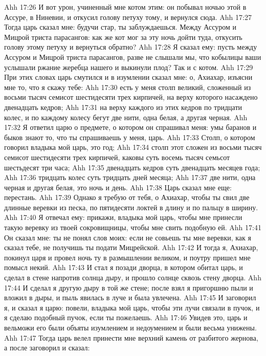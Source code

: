 \vs Ahh 17:26
И вот урон, учиненный мне котом этим: он побывал ночью этой в Ассуре, в Ниневии, и откусил голову петуху тому, и вернулся сюда.
\vs Ahh 17:27
Тогда царь сказал мне: будучи стар, ты заблуждаешься. Между Ассуром и Мицрой триста парасангов: как же кот мог за эту ночь дойти туда, откусить голову этому петуху и вернуться обратно?
\vs Ahh 17:28
Я сказал ему: пусть между Ассуром и Мицрой триста парасангов, разве не слышали мы, что кобылицы ваши услышали ржание жеребца нашего и выкинули плод? Так и с котом.
\vs Ahh 17:29
При этих словах царь смутился и в изумлении сказал мне: о, Ахиахар, изъясни мне то, что я скажу тебе:
\vs Ahh 17:30
есть у меня столп великий, сложенный из восьми тысяч семисот шестидесяти трех кирпичей, на верху которого насаждено двенадцать кедров;
\vs Ahh 17:31
на верху каждого из этих кедров по тридцати колес, и по каждому колесу бегут две нити, одна белая, а другая черная.
\vs Ahh 17:32
Я ответил царю о предмете, о котором он спрашивал меня: умы баранов и быков знают то, что ты спрашиваешь у меня, царь.
\vs Ahh 17:33
Столп, о котором говорил владыка мой царь, это год;
\vs Ahh 17:34
столп этот сложен из восьми тысяч семисот шестидесяти трех кирпичей, каковы суть восемь тысяч семьсот шестьдесят три часа;
\vs Ahh 17:35
двенадцать кедров суть двенадцать месяцев года;
\vs Ahh 17:36
тридцать колес суть тридцать дней месяца;
\vs Ahh 17:37
две нити, одна черная и другая белая, это ночь и день.
\vs Ahh 17:38
Царь сказал мне еще: перестань.
\vs Ahh 17:39
Однако я требую от тебя, о Ахиахар, чтобы ты свил две длинные веревки из песка, по пятидесяти локтей в длину и по пальцу в ширину.
\vs Ahh 17:40
Я отвечал ему: прикажи, владыка мой царь, чтобы мне принесли такую веревку из твоей сокровищницы, чтобы мне свить подобную ей.
\vs Ahh 17:41
Он сказал мне: ты не понял слов моих: если не совьешь ты мне веревки, как я сказал тебе, не получишь ты подати Мицрейской.
\vs Ahh 17:42
И тогда я, Ахиахар, покинул царя и провел ночь ту в размышлении великом, и поутру пришел мне помысл некий.
\vs Ahh 17:43
И стал я позади дворца, в котором обитал царь, и сделал в стене напротив солнца дыру, и прошло солнце сквозь стену дворца.
\vs Ahh 17:44
И сделал я другую дыру в той же стене; после взял я пригоршню пыли и вложил в дыры, и пыль явилась в луче и была увлечена.
\vs Ahh 17:45
И заговорил я, и сказал я царю: повели, владыка мой царь, чтобы эти лучи связали в пучок, и я сделаю подобный пучок, если ты пожелаешь.
\vs Ahh 17:46
Увидев это, царь и вельможи его были объяты изумлением и недоумением и были весьма унижены.
\vs Ahh 17:47
Тогда царь велел принести мне верхний камень от разбитого жернова, а после заговорил и сказал:
